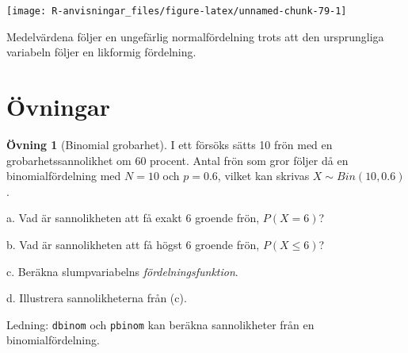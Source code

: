 \documentclass[
]{book}
\theoremstyle{definition}
\theoremstyle{definition}
\theoremstyle{definition}
\newtheorem{exercise}{Övning}[chapter]
\theoremstyle{definition}
\theoremstyle{remark}
\begin{document}
\begin{center}\texttt{[image: R-anvisningar\_files/figure-latex/unnamed-chunk-79-1]} \end{center}

Medelvärdena följer en ungefärlig normalfördelning trots att den ursprungliga variabeln följer en likformig fördelning.

\hypertarget{uxf6vningar-1}{%
\section{Övningar}\label{uxf6vningar-1}}

\begin{exercise}[Binomial grobarhet]
I ett försöks sätts 10 frön med en grobarhetssannolikhet om 60 procent. Antal frön som gror följer då en binomialfördelning med \(N = 10\) och \(p = 0.6\), vilket kan skrivas \(X \sim Bin(10, 0.6)\).

a. Vad är sannolikheten att få exakt 6 groende frön, \(P(X = 6)\)?

b. Vad är sannolikheten att få högst 6 groende frön, \(P(X \leq 6)\)?

c. Beräkna slumpvariabelns \emph{fördelningsfunktion}.

d. Illustrera sannolikheterna från (c).

Ledning: \texttt{dbinom} och \texttt{pbinom} kan beräkna sannolikheter från en binomialfördelning.
\end{exercise}
\end{document}

